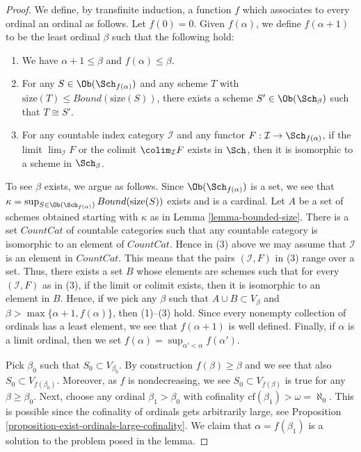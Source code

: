 \begin{proof}
We define, by transfinite induction, a function $f$ which associates
to every ordinal an ordinal as follows. Let $f(0) = 0$.
Given $f(\alpha)$, we define $f(\alpha + 1)$ to be the least
ordinal $\beta$ such that the following hold:
\begin{enumerate}
\item We have $\alpha + 1 \leq \beta$ and $f(\alpha) \leq \beta$.
\item For any $S \in \Ob(\Sch_{f(\alpha)})$ and any
scheme $T$ with $\text{size}(T) \leq Bound(\text{size}(S))$,
there exists a scheme $S' \in \Ob(\Sch_\beta)$
such that $T \cong S'$.
\item For any countable index category $\mathcal{I}$ and
any functor $F : \mathcal{I} \to \Sch_{f(\alpha)}$, if
the limit $\lim_\mathcal{I} F$ or the colimit
$\colim_\mathcal{I} F$ exists in $\Sch$,
then it is isomorphic to a scheme in $\Sch_\beta$.
\end{enumerate}
To see $\beta$ exists, we argue as follows. Since
$\Ob(\Sch_{f(\alpha)})$ is a set, we see that
$\kappa =
\sup_{S \in \Ob(\Sch_{f(\alpha)})} Bound(\text{size}(S))$
exists and is a cardinal.
Let $A$ be a set of schemes obtained starting with $\kappa$
as in Lemma \ref{lemma-bounded-size}.
There is a set $CountCat$ of countable
categories such that any countable category is isomorphic to
an element of $CountCat$. Hence in (3) above we may assume
that $\mathcal{I}$ is an element in $CountCat$. This means that
the pairs $(\mathcal{I}, F)$ in (3) range over a set.
Thus, there exists a set $B$ whose elements are schemes
such that for every $(\mathcal{I}, F)$ as in (3), if the
limit or colimit exists, then it is isomorphic to an element in $B$.
Hence, if we pick any $\beta$ such that $A \cup B \subset V_\beta$
and $\beta > \max\{\alpha + 1, f(\alpha)\}$, then (1)--(3) hold.
Since every nonempty collection of ordinals has a least element,
we see that $f(\alpha + 1)$ is well defined. Finally, if $\alpha$
is a limit ordinal, then we set
$f(\alpha) = \sup_{\alpha' < \alpha} f(\alpha')$.

\medskip\noindent
Pick $\beta_0$ such that $S_0 \subset V_{\beta_0}$.
By construction $f(\beta) \geq \beta$ and we see that
also $S_0 \subset V_{f(\beta_0)}$. Moreover, as $f$ is
nondecreasing, we see $S_0 \subset V_{f(\beta)}$ is true for any
$\beta \geq \beta_0$.
Next, choose any ordinal $\beta_1 > \beta_0$ with cofinality
$\text{cf}(\beta_1) > \omega = \aleph_0$. This is possible
since the cofinality of ordinals gets arbitrarily large, see
Proposition \ref{proposition-exist-ordinals-large-cofinality}.
We claim that
$\alpha = f(\beta_1)$ is a solution to the problem posed in the lemma.


\end{proof}
